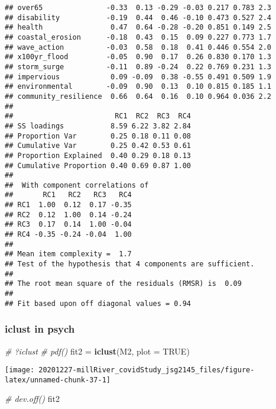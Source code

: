\documentclass[
]{article}
\newenvironment{Shaded}{\begin{snugshade}}{\end{snugshade}}
\newcommand{\CommentTok}[1]{\textcolor[rgb]{0.56,0.35,0.01}{\textit{#1}}}
\newcommand{\DataTypeTok}[1]{\textcolor[rgb]{0.13,0.29,0.53}{#1}}
\newcommand{\KeywordTok}[1]{\textcolor[rgb]{0.13,0.29,0.53}{\textbf{#1}}}
\newcommand{\NormalTok}[1]{#1}
\newcommand{\OtherTok}[1]{\textcolor[rgb]{0.56,0.35,0.01}{#1}}
\newcommand{\StringTok}[1]{\textcolor[rgb]{0.31,0.60,0.02}{#1}}
\begin{document}
\begin{verbatim}
## over65               -0.33  0.13 -0.29 -0.03 0.217 0.783 2.3
## disability           -0.19  0.44  0.46 -0.10 0.473 0.527 2.4
## health                0.47  0.64 -0.28 -0.20 0.851 0.149 2.5
## coastal_erosion      -0.18  0.43  0.15  0.09 0.227 0.773 1.7
## wave_action          -0.03  0.58  0.18  0.41 0.446 0.554 2.0
## x100yr_flood         -0.05  0.90  0.17  0.26 0.830 0.170 1.3
## storm_surge          -0.11  0.89 -0.24  0.22 0.769 0.231 1.3
## impervious            0.09 -0.09  0.38 -0.55 0.491 0.509 1.9
## environmental        -0.09  0.90  0.13  0.10 0.815 0.185 1.1
## community_resilience  0.66  0.64  0.16  0.10 0.964 0.036 2.2
## 
##                        RC1  RC2  RC3  RC4
## SS loadings           8.59 6.22 3.82 2.84
## Proportion Var        0.25 0.18 0.11 0.08
## Cumulative Var        0.25 0.42 0.53 0.61
## Proportion Explained  0.40 0.29 0.18 0.13
## Cumulative Proportion 0.40 0.69 0.87 1.00
## 
##  With component correlations of 
##       RC1   RC2   RC3   RC4
## RC1  1.00  0.12  0.17 -0.35
## RC2  0.12  1.00  0.14 -0.24
## RC3  0.17  0.14  1.00 -0.04
## RC4 -0.35 -0.24 -0.04  1.00
## 
## Mean item complexity =  1.7
## Test of the hypothesis that 4 components are sufficient.
## 
## The root mean square of the residuals (RMSR) is  0.09 
## 
## Fit based upon off diagonal values = 0.94
\end{verbatim}

\hypertarget{iclust-in-psych}{%
\subsubsection{iclust in psych}\label{iclust-in-psych}}

\begin{Shaded}
\begin{Highlighting}[]
\CommentTok{# ?iclust}
\CommentTok{# pdf()}
\NormalTok{fit2 =}\StringTok{ }\KeywordTok{iclust}\NormalTok{(M2, }\DataTypeTok{plot =} \OtherTok{TRUE}\NormalTok{)}
\end{Highlighting}
\end{Shaded}

\texttt{[image: 20201227-millRiver\_covidStudy\_jsg2145\_files/figure-latex/unnamed-chunk-37-1]}

\begin{Shaded}
\begin{Highlighting}[]
\CommentTok{# dev.off()}
\NormalTok{fit2}
\end{Highlighting}
\end{Shaded}
\end{document}
